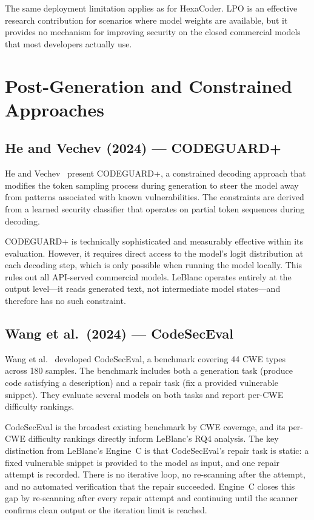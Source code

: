 \documentclass[12pt,a4paper]{report}
\begin{document}
The same deployment limitation applies as for HexaCoder. LPO is an effective
research contribution for scenarios where model weights are available, but it
provides no mechanism for improving security on the closed commercial models
that most developers actually use.

\section{Post-Generation and Constrained Approaches}
\label{sec:litpost}

\subsection{He and Vechev (2024) --- CODEGUARD+}
\label{ssec:codeguard}

He and Vechev~\cite{codeguard2024} present CODEGUARD+, a constrained decoding
approach that modifies the token sampling process during generation to steer the
model away from patterns associated with known vulnerabilities. The constraints
are derived from a learned security classifier that operates on partial token
sequences during decoding.

CODEGUARD+ is technically sophisticated and measurably effective within its
evaluation. However, it requires direct access to the model's logit distribution
at each decoding step, which is only possible when running the model locally.
This rules out all API-served commercial models. LeBlanc operates entirely at
the output level---it reads generated text, not intermediate model states---and
therefore has no such constraint.

\subsection{Wang et al.\ (2024) --- CodeSecEval}
\label{ssec:codeseceval}

Wang et al.~\cite{codeseceval2023} developed CodeSecEval, a benchmark covering
44 CWE types across 180 samples. The benchmark includes both a generation task
(produce code satisfying a description) and a repair task (fix a provided
vulnerable snippet). They evaluate several models on both tasks and report
per-CWE difficulty rankings.

CodeSecEval is the broadest existing benchmark by CWE coverage, and its per-CWE
difficulty rankings directly inform LeBlanc's RQ4 analysis. The key distinction
from LeBlanc's Engine~C is that CodeSecEval's repair task is static: a fixed
vulnerable snippet is provided to the model as input, and one repair attempt is
recorded. There is no iterative loop, no re-scanning after the attempt, and no
automated verification that the repair succeeded. Engine~C closes this gap by
re-scanning after every repair attempt and continuing until the scanner confirms
clean output or the iteration limit is reached.
\end{document}
